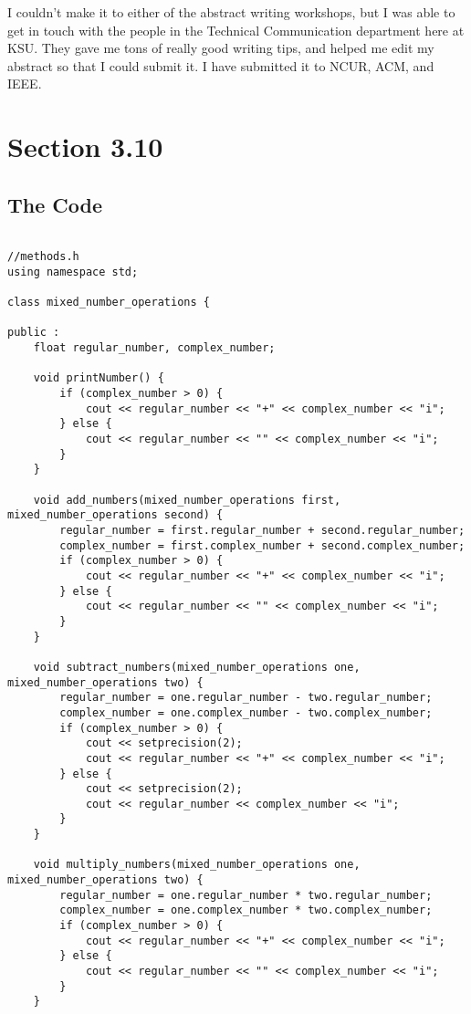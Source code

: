 \documentclass[11pt]{article}
\begin{document}
I couldn't make it to either of the abstract writing workshops, but I was able to get in touch with the people in the Technical Communication department here at KSU. They gave me tons of really good writing tips, and helped me edit my abstract so that I could submit it. I have submitted it to NCUR, ACM, and IEEE. 

\section*{Section 3.10}

\subsection*{The Code}
\begin{lstlisting}

//methods.h
using namespace std;

class mixed_number_operations {

public :
    float regular_number, complex_number;

    void printNumber() {
        if (complex_number > 0) {
            cout << regular_number << "+" << complex_number << "i";
        } else {
            cout << regular_number << "" << complex_number << "i";
        }
    }

    void add_numbers(mixed_number_operations first, mixed_number_operations second) {
        regular_number = first.regular_number + second.regular_number;
        complex_number = first.complex_number + second.complex_number;
        if (complex_number > 0) {
            cout << regular_number << "+" << complex_number << "i";
        } else {
            cout << regular_number << "" << complex_number << "i";
        }
    }

    void subtract_numbers(mixed_number_operations one, mixed_number_operations two) {
        regular_number = one.regular_number - two.regular_number;
        complex_number = one.complex_number - two.complex_number;
        if (complex_number > 0) {
            cout << setprecision(2);
            cout << regular_number << "+" << complex_number << "i";
        } else {
            cout << setprecision(2);
            cout << regular_number << complex_number << "i";
        }
    }

    void multiply_numbers(mixed_number_operations one, mixed_number_operations two) {
        regular_number = one.regular_number * two.regular_number;
        complex_number = one.complex_number * two.complex_number;
        if (complex_number > 0) {
            cout << regular_number << "+" << complex_number << "i";
        } else {
            cout << regular_number << "" << complex_number << "i";
        }
    }


\end{lstlisting}
\end{document}
